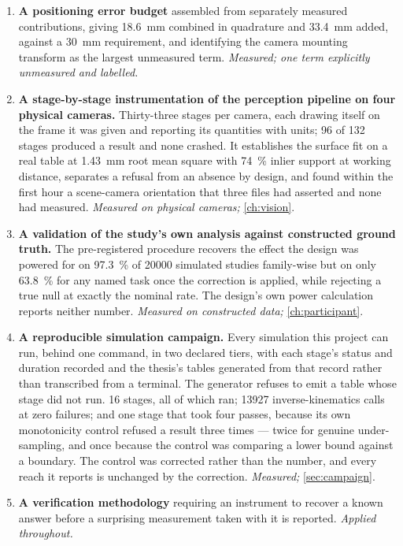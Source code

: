\begin{enumerate}
  \item \textbf{A positioning error budget} assembled from separately measured
    contributions, giving \SI{18.6}{\milli\metre} combined in quadrature and
    \SI{33.4}{\milli\metre} added, against a \SI{30}{\milli\metre}
    requirement, and identifying the camera mounting transform as the largest
    unmeasured term. \emph{Measured; one term explicitly unmeasured and
    labelled.}

  \item \textbf{A stage-by-stage instrumentation of the perception pipeline
    on four physical cameras.} Thirty-three stages per camera, each drawing
    itself on the frame it was given and reporting its quantities with units;
    \num{96} of \num{132} stages produced a result and none crashed. It
    establishes the surface fit on a real table at \SI{1.43}{\milli\metre}
    root mean square with \SI{74}{\percent} inlier support at working
    distance, separates a refusal from an absence by design, and found within
    the first hour a scene-camera orientation that three files had asserted
    and none had measured. \emph{Measured on physical cameras;}
    \cref{ch:vision}.

  \item \textbf{A validation of the study's own analysis against constructed
    ground truth.} The pre-registered procedure recovers the effect the design
    was powered for on \SI{97.3}{\percent} of \num{20000} simulated studies
    family-wise but on only \SI{63.8}{\percent} for any named task once the
    correction is applied, while rejecting a true null at exactly the nominal
    rate. The design's own power calculation reports neither number.
    \emph{Measured on constructed data;} \cref{ch:participant}.

  \item \textbf{A reproducible simulation campaign.} Every simulation this
    project can run, behind one command, in two declared tiers, with each
    stage's status and duration recorded and the thesis's tables generated
    from that record rather than transcribed from a terminal. The generator
    refuses to emit a table whose stage did not run. \num{16} stages, all of
    which ran; \num{13927} inverse-kinematics calls at zero failures; and one
    stage that took four passes, because its own monotonicity control refused
    a result three times --- twice for genuine under-sampling, and once
    because the control was comparing a lower bound against a boundary. The
    control was corrected rather than the number, and every reach it reports
    is unchanged by the correction. \emph{Measured;} \cref{sec:campaign}.

  \item \textbf{A verification methodology} requiring an instrument to recover
    a known answer before a surprising measurement taken with it is reported.
    \emph{Applied throughout.}
\end{enumerate}

